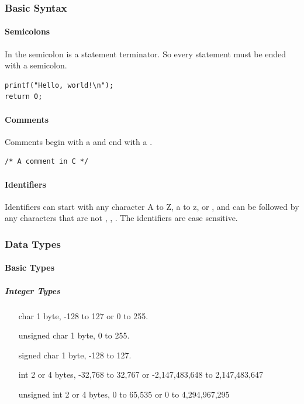\documentclass[../languages.tex]{subfiles}
\begin{document}
\subsubsection{Basic Syntax}
\label{ssub:basic_syntax}

\paragraph{Semicolons}
\label{par:semicolons}

In  the semicolon is a statement terminator. So every statement must be
ended with a semicolon.

\begin{verbatim}
printf("Hello, world!\n");
return 0;
\end{verbatim}

\paragraph{Comments}
\label{par:comments}

Comments begin with a \cd{/*} and end with a \cd{*/}.

\begin{verbatim}
/* A comment in C */
\end{verbatim}

\paragraph{Identifiers}
\label{par:identifiers}

Identifiers can start with any character A to Z, a to z, or \cd{\_}, and can be
followed by any characters that are not , \cd{\$}, \cd{\%}. The
identifiers are case sensitive.

\subsubsection{Data Types}
\label{ssub:data_types}

\paragraph{Basic Types}
\label{par:basic_types}

\subparagraph{Integer Types}
\label{spar:integer_types}

\begin{enumerate}
  \item[char] 1 byte, -128 to 127 or 0 to 255.
  \item[unsigned char] 1 byte, 0 to 255.
  \item[signed char] 1 byte, -128 to 127.
  \item[int] 2 or 4 bytes, -32,768 to 32,767 or -2,147,483,648 to 2,147,483,647
  \item[unsigned int] 2 or 4 bytes, 0 to 65,535 or 0 to 4,294,967,295
\end{enumerate}

\newpage
\end{document}
